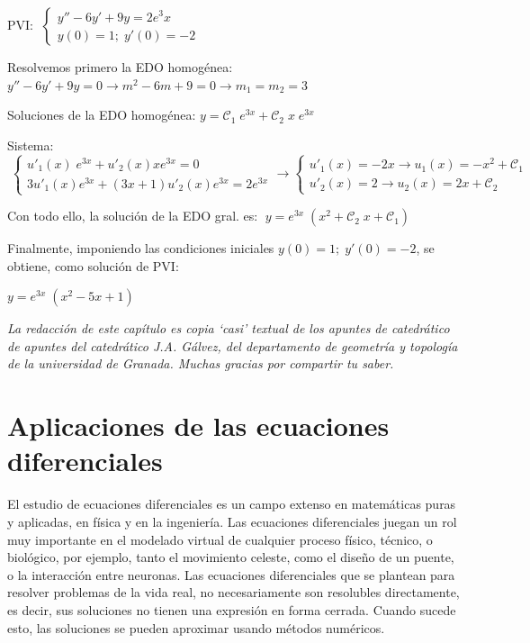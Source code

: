 \begin{ejem}
	PVI: $\; \begin{cases} y''-6y'+9y=2e^3x \\ y(0)=1; \; y'(0)=-2 \end{cases}$

Resolvemos primero la EDO homogénea: $y''-6y'+9y=0 \to m^2-6m+9=0 \to m_1=m_2=3$

Soluciones de la EDO homogénea: $y=\mathcal{C}_1 \; e^{3x} + \mathcal{C}_2\; x \; e^{3x}$

Sistema: $\; \begin{cases}
 u'_1(x)\; e^{3x} + u'_2(x) x e^{3x} =0 \\
 3u'_1(x) e^{3x}+(3x+1) u'_2(x) e^{3x}=2 e^{3x}	
 \end{cases} 	\to \begin{cases}
 u'_1(x)= -2x \to u_1(x)=-x^2 + \mathcal{C}_1 \\
 u'_2(x)=2 \to u_2(x)=2x+\mathcal{C}_2	
 \end{cases}$
 
 Con todo ello, la solución de la EDO gral. es:  $\; y=e^{3x}\; (x^2+\mathcal{C}_2\; x + \mathcal{C}_1)$
 
 Finalmente, imponiendo las condiciones iniciales $y(0)=1; \; y'(0)=-2$, se obtiene, como solución de PVI:
 
 \hspace{30mm} $y=e^{3x}\; (x^2-5x+1)$
 

\end{ejem}



\textit{La redacción de este capítulo es copia `casi' textual de los apuntes de catedrático de apuntes del catedrático J.A. Gálvez, del departamento de geometría y topología de la universidad de Granada. Muchas gracias por compartir tu saber.}




\section{Aplicaciones de las ecuaciones diferenciales}


\vspace{3mm}

\textcolor{gris}{
El estudio de ecuaciones diferenciales es un campo extenso en matemáticas puras y  aplicadas, en física y en la ingeniería. Las ecuaciones diferenciales juegan un rol muy importante en el modelado virtual de cualquier proceso físico, técnico, o biológico, por ejemplo, tanto el movimiento celeste, como el diseño de un puente, o la interacción entre neuronas. Las ecuaciones diferenciales que se plantean para resolver problemas de la vida real, no necesariamente son resolubles directamente, es decir, sus soluciones no tienen una expresión en forma cerrada. Cuando sucede esto, las soluciones se pueden aproximar usando métodos numéricos.}

